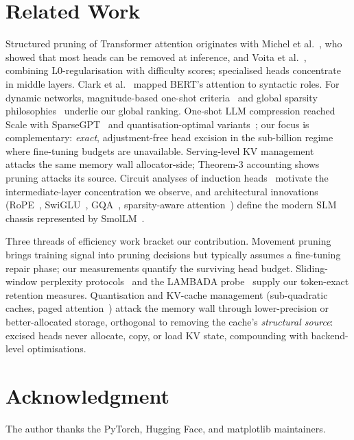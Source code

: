 \documentclass[10pt,journal,compsoc]{IEEEtran}
\begin{document}
\section{Related Work}
Structured pruning of Transformer attention originates with
Michel et al.~\cite{michel2019sixteen}, who showed that most heads can be removed
at inference, and Voita et al.~\cite{voita2019analyzing}, combining
L0-regularisation with difficulty scores; specialised heads concentrate in
middle layers. Clark et
al.~\cite{clark2019what} mapped BERT's attention to syntactic roles. For dynamic
networks, magnitude-based one-shot criteria~\cite{molchanov2017pruning} and
global sparsity philosophies~\cite{hoefler2021sparsity} underlie our global
ranking. One-shot LLM compression reached Scale with SparseGPT~\cite{frantar2023sparsegpt}
and quantisation-optimal variants~\cite{frantar2023opt, xiao2023efficient, lin2024awq,
meng2024ppl}; our focus is complementary: \emph{exact}, adjustment-free head
excision in the sub-billion regime where fine-tuning budgets are unavailable.
Serving-level KV management~\cite{kwon2023efficient} attacks the same memory wall
allocator-side; Theorem-3 accounting shows pruning attacks its source. Circuit
analyses of induction
heads~\cite{elhage2021mathematical, olsson2022context, papadimitriou2022subject}
motivate the intermediate-layer concentration we observe, and architectural
innovations (RoPE~\cite{su2024roformer}, SwiGLU~\cite{shazeer2020glu},
GQA~\cite{ainslie2023gqa}, sparsity-aware attention~\cite{laterale2023heads})
define the modern SLM chassis represented by SmolLM~\cite{allal2025smollm}.

Three threads of efficiency work bracket our contribution. Movement
pruning~\cite{sanh2020movement} brings training signal into pruning decisions
but typically assumes a fine-tuning repair phase; our measurements quantify the
surviving head budget. Sliding-window perplexity
protocols~\cite{merity2016pointer} and the LAMBADA
probe~\cite{paperno2016lambada} supply our token-exact retention measures.
Quantisation and KV-cache management
(sub-quadratic caches, paged attention~\cite{kwon2023efficient}) attack the
memory wall through lower-precision or better-allocated storage, orthogonal to
removing the cache's \emph{structural source}: excised heads never allocate,
copy, or load KV state, compounding with backend-level optimisations.

\section*{Acknowledgment}
The author thanks the PyTorch, Hugging Face, and matplotlib maintainers.
\vspace*{-10pt}
\balance


\end{document}

